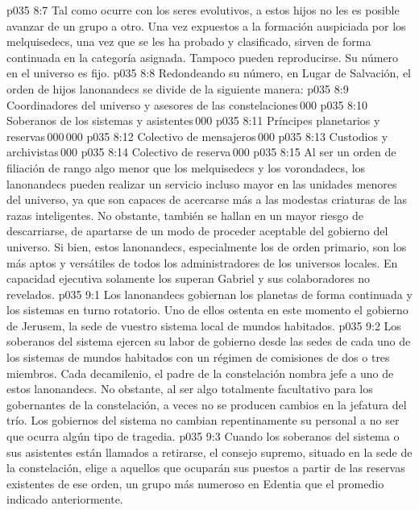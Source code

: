 \vs p035 8:7 \pc Tal como ocurre con los seres evolutivos, a estos hijos no les es posible avanzar de un grupo a otro. Una vez expuestos a la formación auspiciada por los melquisedecs, una vez que se les ha probado y clasificado, sirven de forma continuada en la categoría asignada. Tampoco pueden reproducirse. Su número en el universo es fijo.
\vs p035 8:8 Redondeando su número, en Lugar de Salvación, el orden de hijos lanonandecs se divide de la siguiente manera:
\vs p035 8:9 \pc Coordinadores del universo y asesores de las constelaciones\,000
\vs p035 8:10 Soberanos de los sistemas y asistentes\,000
\vs p035 8:11 Príncipes planetarios y reservas\,000\,000
\vs p035 8:12 Colectivo de mensajeros\,000
\vs p035 8:13 Custodios y archivistas\,000
\vs p035 8:14 Colectivo de reserva\,000
\vs p035 8:15 \pc Al ser un orden de filiación de rango algo menor que los melquisedecs y los vorondadecs, los lanonandecs pueden realizar un servicio incluso mayor en las unidades menores del universo, ya que son capaces de acercarse más a las modestas criaturas de las razas inteligentes. No obstante, también se hallan en un mayor riesgo de descarriarse, de apartarse de un modo de proceder aceptable del gobierno del universo. Si bien, estos lanonandecs, especialmente los de orden primario, son los más aptos y versátiles de todos los administradores de los universos locales. En capacidad ejecutiva solamente los superan Gabriel y sus colaboradores no revelados.
\vs p035 9:1 Los lanonandecs gobiernan los planetas de forma continuada y los sistemas en turno rotatorio. Uno de ellos ostenta en este momento el gobierno de Jerusem, la sede de vuestro sistema local de mundos habitados.
\vs p035 9:2 Los soberanos del sistema ejercen su labor de gobierno desde las sedes de cada uno de los sistemas de mundos habitados con un régimen de comisiones de dos o tres miembros. Cada decamilenio, el padre de la constelación nombra jefe a uno de estos lanonandecs. No obstante, al ser algo totalmente facultativo para los gobernantes de la constelación, a veces no se producen cambios en la jefatura del trío. Los gobiernos del sistema no cambian repentinamente su personal a no ser que ocurra algún tipo de tragedia.
\vs p035 9:3 Cuando los soberanos del sistema o sus asistentes están llamados a retirarse, el consejo supremo, situado en la sede de la constelación, elige a aquellos que ocuparán sus puestos a partir de las reservas existentes de ese orden, un grupo más numeroso en Edentia que el promedio indicado anteriormente.

